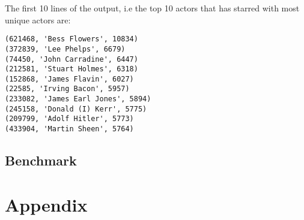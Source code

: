\documentclass[a4paper,11pt]{article}
\begin{document}
The first 10 lines of the output, i.e the top 10 actors that has starred with most unique actors are: 

\begin{verbatim}
(621468, 'Bess Flowers', 10834)
(372839, 'Lee Phelps', 6679)
(74450, 'John Carradine', 6447)
(212581, 'Stuart Holmes', 6318)
(152868, 'James Flavin', 6027)
(22585, 'Irving Bacon', 5957)
(233082, 'James Earl Jones', 5894)
(245158, 'Donald (I) Kerr', 5775)
(209799, 'Adolf Hitler', 5773)
(433904, 'Martin Sheen', 5764)
\end{verbatim}





\subsection{Benchmark}

\section{Appendix}
\end{document}
